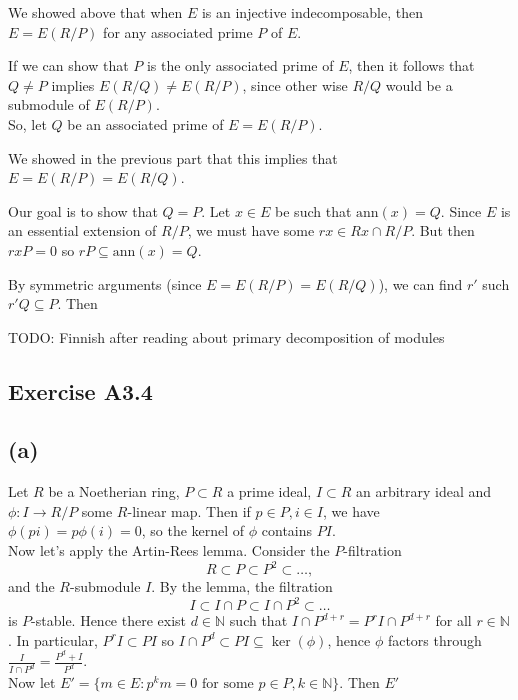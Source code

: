 \documentclass{article}
\theoremstyle{definition}
\newcommand{\N}{\mathbb{N}}
\newcommand{\ann}{\text{ann}}
\begin{document}
We showed above that when $E$ is an injective indecomposable, then $E = E(R/P)$
for any associated prime $P$ of $E$. 

If we can show that $P$ is the only associated prime of $E$, then it follows
that $Q \not = P$ implies $E(R/Q) \not = E(R/P)$, since other wise $R/Q$ would
be a submodule of $E(R/P)$. \\

So, let $Q$ be an associated prime of $E = E(R/P)$. 

We showed in the previous part that this implies that $E = E(R/P) = E(R/Q)$.

Our goal is to show that $Q = P$. Let $x \in E$ be such that $\ann(x) = Q$.
Since $E$ is an essential extension of $R/P$, we must have some $rx \in Rx \cap
R/P$. But then $rxP = 0$ so $rP \subseteq \ann(x) = Q$. 

By symmetric arguments (since $E = E(R/P) = E(R/Q)$), we can find $r'$ such
$r'Q \subseteq P$. Then

TODO: Finnish after reading about primary decomposition of modules

\subsection*{Exercise A3.4}

\subsection*{(a)}

Let $R$ be a Noetherian ring, $P \subset R$ a prime ideal, $I \subset R$ an
arbitrary ideal and $\phi : I \to R/P$ some $R$-linear map. Then if $p \in P, i
\in I$, we have $\phi(pi) = p \phi(i) = 0$, so the kernel of $\phi$ contains
$PI$. \\

Now let's apply the Artin-Rees lemma. Consider the $P$-filtration
\[
	R \subset P \subset P^2 \subset \ldots,
\]
and the $R$-submodule $I$. By the lemma, the filtration 
\[
	I \subset I \cap P \subset I \cap P^2 \subset \ldots
\] 
is $P$-stable. Hence there exist $d \in \N$ such that $I \cap P^{d + r} =
P^{r}I \cap P^{d + r}$ for all $r \in \N$. In particular, $P^{r}I \subset PI$
so $I \cap P^{d} \subset PI \subseteq \ker(\phi)$, hence $\phi$ factors through
$\frac{I}{I \cap P^{d}} = \frac{P^{d} + I}{P^{d}}$. \\

Now let $E' = \{m \in E : p^km = 0 \text{ for some } p \in P, k \in \N \}.$ Then 
$E'$
\end{document}
